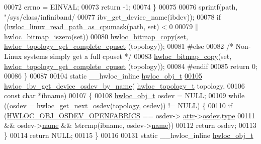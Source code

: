 \begin{DoxyCode}
00072     errno = EINVAL;
00073     \textcolor{keywordflow}{return} -1;
00074   \}
00075 
00076   sprintf(path, \textcolor{stringliteral}{"/sys/class/infiniband/%
00077           ibv\_get\_device\_name(ibdev));
00078   \textcolor{keywordflow}{if} (\hyperlink{a00214_gaf72d83e273803226ce772973e37b85de}{hwloc\_linux\_read\_path\_as\_cpumask}(path, \textcolor{keyword}{set}) < 0
00079       || \hyperlink{a00205_ga5b64be28f5a7176ed8ad0d6a90bdf108}{hwloc\_bitmap\_iszero}(\textcolor{keyword}{set}))
00080     \hyperlink{a00205_ga72a29824798b48784b8217471ec8f14c}{hwloc\_bitmap\_copy}(\textcolor{keyword}{set}, \hyperlink{a00202_gaee30e03391c1ed7dfd617fb5c7bbb033}{hwloc\_topology\_get\_complete\_cpuset}
      (topology));
00081 \textcolor{preprocessor}{#else}
00082   \textcolor{comment}{/* Non-Linux systems simply get a full cpuset */}
00083   \hyperlink{a00205_ga72a29824798b48784b8217471ec8f14c}{hwloc\_bitmap\_copy}(\textcolor{keyword}{set}, \hyperlink{a00202_gaee30e03391c1ed7dfd617fb5c7bbb033}{hwloc\_topology\_get\_complete\_cpuset}
      (topology));
00084 \textcolor{preprocessor}{#endif}
00085   \textcolor{keywordflow}{return} 0;
00086 \}
00087 
00104 \textcolor{keyword}{static} \_\_hwloc\_inline \hyperlink{a00238}{hwloc\_obj\_t}
\hyperlink{a00224_ga31d794567f4420bbdc8baa7bf8bf6138}{00105} \hyperlink{a00224_ga31d794567f4420bbdc8baa7bf8bf6138}{hwloc\_ibv\_get\_device\_osdev\_by\_name}(
      \hyperlink{a00186_ga9d1e76ee15a7dee158b786c30b6a6e38}{hwloc\_topology\_t} topology,
00106                                    \textcolor{keyword}{const} \textcolor{keywordtype}{char} *ibname)
00107 \{
00108         \hyperlink{a00238}{hwloc\_obj\_t} osdev = NULL;
00109         \textcolor{keywordflow}{while} ((osdev = \hyperlink{a00204_ga8b4584c8949e2c5f1c97ba7fe92b8145}{hwloc\_get\_next\_osdev}(topology, osdev)) != NULL) \{
00110                 \textcolor{keywordflow}{if} (\hyperlink{a00184_gga64f5d539df299c97ae80ce53fc4b56c0a52157d03694fdae82dddd57ca8c973b6}{HWLOC\_OBJ\_OSDEV\_OPENFABRICS} == osdev->
      \hyperlink{a00238_accd40e29f71f19e88db62ea3df02adc8}{attr}->\hyperlink{a00242_a22904c25fe44b323bab5c9bc52660fca}{osdev}.\hyperlink{a00282_a31e019e27e54ac6138d04be639bb96f9}{type}
00111                     && osdev->\hyperlink{a00238_abb709ec38f2970677e4e57d1d30be96d}{name} && !strcmp(ibname, osdev->\hyperlink{a00238_abb709ec38f2970677e4e57d1d30be96d}{name}))
00112                         \textcolor{keywordflow}{return} osdev;
00113         \}
00114         \textcolor{keywordflow}{return} NULL;
00115 \}
00116 
00131 \textcolor{keyword}{static} \_\_hwloc\_inline \hyperlink{a00238}{hwloc\_obj\_t}
}
\end{DoxyCode}
